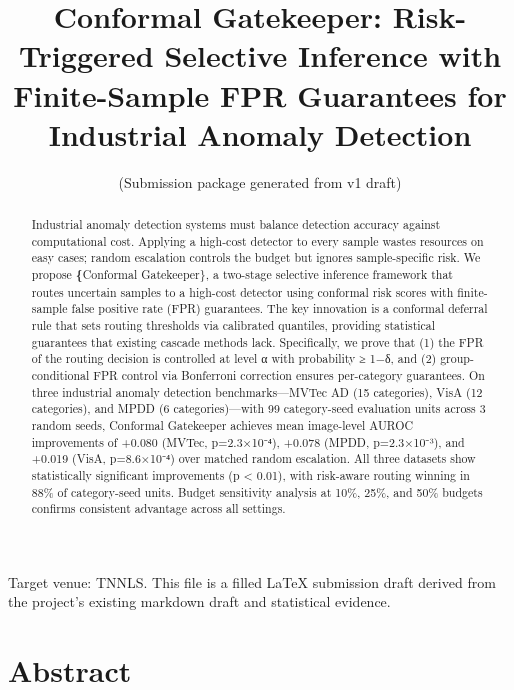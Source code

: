 \documentclass[10pt]{article}
\title{Conformal Gatekeeper: Risk-Triggered Selective Inference with Finite-Sample FPR Guarantees for Industrial Anomaly Detection}
\author{(Submission package generated from v1 draft)}
\begin{document}
\maketitle
\begin{abstract}
Industrial anomaly detection systems must balance detection accuracy against computational cost. Applying a high-cost detector to every sample wastes resources on easy cases; random escalation controls the budget but ignores sample-specific risk. We propose \textbf\{Conformal Gatekeeper\}, a two-stage selective inference framework that routes uncertain samples to a high-cost detector using conformal risk scores with finite-sample false positive rate (FPR) guarantees. The key innovation is a conformal deferral rule that sets routing thresholds via calibrated quantiles, providing statistical guarantees that existing cascade methods lack. Specifically, we prove that (1) the FPR of the routing decision is controlled at level α with probability ≥ 1−δ, and (2) group-conditional FPR control via Bonferroni correction ensures per-category guarantees. On three industrial anomaly detection benchmarks—MVTec AD (15 categories), VisA (12 categories), and MPDD (6 categories)—with 99 category-seed evaluation units across 3 random seeds, Conformal Gatekeeper achieves mean image-level AUROC improvements of +0.080 (MVTec, p=2.3×10⁻⁴), +0.078 (MPDD, p=2.3×10⁻³), and +0.019 (VisA, p=8.6×10⁻⁴) over matched random escalation. All three datasets show statistically significant improvements (p < 0.01), with risk-aware routing winning in 88\% of category-seed units. Budget sensitivity analysis at 10\%, 25\%, and 50\% budgets confirms consistent advantage across all settings.
\end{abstract}

Target venue: TNNLS. This file is a filled LaTeX submission draft derived from the project's existing markdown draft and statistical evidence.


\section{Abstract}
\end{document}
